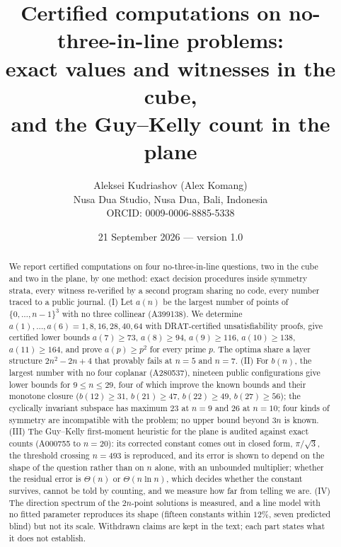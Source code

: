 \documentclass[11pt,a4paper]{article}
\title{Certified computations on no-three-in-line problems:\\ exact values and witnesses in the cube,\\ and the Guy--Kelly count in the plane}
\author{Aleksei Kudriashov (Alex Komang)\\ \small Nusa Dua Studio, Nusa Dua, Bali, Indonesia\\ \small ORCID: 0009-0006-8885-5338}
\date{21 September 2026 --- version 1.0}
\begin{document}
\maketitle
\begin{abstract}
We report certified computations on four no-three-in-line questions, two in the cube and two in the plane, by one method:
exact decision procedures inside symmetry strata, every witness re-verified by a second program sharing no code, every number
traced to a public journal.
(I) Let $a(n)$ be the largest number of points of $\{0,\dots,n-1\}^3$ with no three collinear (A399138). We determine
$a(1),\dots,a(6)=1,8,16,28,40,64$ with DRAT-certified unsatisfiability proofs, give certified lower bounds
$a(7)\ge73$, $a(8)\ge94$, $a(9)\ge116$, $a(10)\ge138$, $a(11)\ge164$, and prove $a(p)\ge p^2$ for every prime $p$. The optima
share a layer structure $2n^2-2n+4$ that provably fails at $n=5$ and $n=7$.
(II) For $b(n)$, the largest number with no four coplanar (A280537), nineteen public configurations give lower bounds for
$9\le n\le29$, four of which improve the known bounds and their monotone closure ($b(12)\ge31$, $b(21)\ge47$, $b(22)\ge49$,
$b(27)\ge56$); the cyclically invariant subspace has maximum $23$ at $n=9$ and $26$ at $n=10$; four kinds of symmetry are
incompatible with the problem; no upper bound beyond $3n$ is known.
(III) The Guy--Kelly first-moment heuristic for the plane is audited against exact counts (A000755 to $n=20$): its corrected
constant comes out in closed form, $\pi/\sqrt3$, the threshold crossing $n=493$ is reproduced, and its error is shown to depend
on the shape of the question rather than on $n$ alone, with an unbounded multiplier; whether the residual error is
$\Theta(n)$ or $\Theta(n\ln n)$, which decides whether the constant survives, cannot be told by counting, and we measure how far
from telling we are.
(IV) The direction spectrum of the $2n$-point solutions is measured, and a line model with no fitted
parameter reproduces its shape (fifteen constants within $12\%$, seven predicted blind) but not its scale.
Withdrawn claims are kept in the text; each part states what it does not establish.
\end{abstract}
\end{document}
